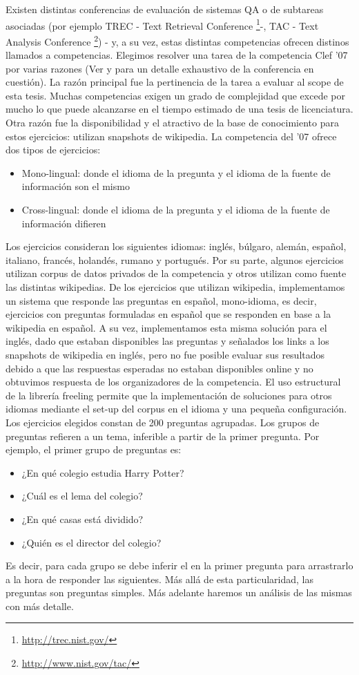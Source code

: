 Existen distintas conferencias de evaluación de sistemas QA o de subtareas asociadas (por ejemplo TREC - Text Retrieval Conference \footnote{\url{http://trec.nist.gov/}}-, TAC - Text Analysis Conference \footnote{\url{http://www.nist.gov/tac/}}) - y, a su vez, estas distintas competencias ofrecen distinos llamados a competencias. Elegimos resolver una tarea de la competencia Clef '07  por varias razones (Ver \cite{GuidelineClef07} y \cite{OverviewClef07} para un detalle exhaustivo de la conferencia en cuestión). La razón principal fue la pertinencia de la tarea a evaluar al scope de esta tesis. Muchas competencias exigen un grado de complejidad que excede por mucho lo que puede alcanzarse en el tiempo estimado de una tesis de licenciatura. 
Otra razón fue la disponibilidad y el atractivo de la base de conocimiento para estos ejercicios: utilizan snapshots de wikipedia. 
La competencia del '07 ofrece dos tipos de ejercicios:
\begin{itemize}
\item Mono-lingual: donde el idioma de la pregunta y el idioma de la fuente de información son el mismo
\item Cross-lingual: donde el idioma de la pregunta y el idioma de la fuente de información difieren
\end{itemize}
Los ejercicios consideran los siguientes idiomas: inglés, búlgaro, alemán, español, italiano, francés, holandés, rumano y portugués. Por su parte, algunos
ejercicios utilizan corpus de datos privados de la competencia y otros utilizan como fuente las distintas wikipedias. De los ejercicios que utilizan
wikipedia, implementamos un sistema que responde las preguntas en español, mono-idioma, es decir, ejercicios con preguntas formuladas en español que se responden en base a la wikipedia en español. A su vez, implementamos esta misma solución para el inglés, dado que estaban disponibles las preguntas y señalados los links a los snapshots de wikipedia en inglés, pero no fue posible evaluar sus resultados debido a que las respuestas esperadas no estaban disponibles online y no obtuvimos respuesta de los organizadores de la competencia. El uso estructural de la librería freeling permite que la implementación de soluciones para otros idiomas mediante el set-up del corpus en el idioma y una pequeña configuración. 
Los ejercicios elegidos constan de 200 preguntas agrupadas. Los grupos de preguntas refieren a un tema, inferible a partir de la primer pregunta.
Por ejemplo, el primer grupo de preguntas es:
\begin{itemize}
\item ¿En qué colegio estudia Harry Potter?
\item ¿Cuál es el lema del colegio?
\item ¿En qué casas está dividido?
\item ¿Quién es el director del colegio?
\end{itemize}
Es decir, para cada grupo se debe inferir el  en la primer pregunta para arrastrarlo a la hora de responder las siguientes. Más allá de esta particularidad,
las preguntas son preguntas simples. Más adelante haremos un análisis de las mismas con más detalle.

